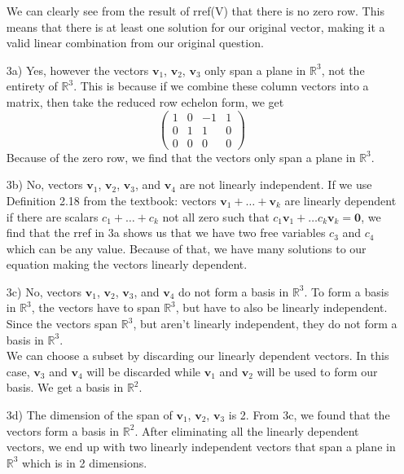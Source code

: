 \documentclass{article}
\begin{document}
\begin{enumerate}
    We can clearly see from the result of
    rref(V) that there is no zero row. This means that there is at least one solution
    for our original vector, making it a valid linear combination from our original question.

    \item[3a)] Yes, however the vectors ${\textbf{v}}_1$, ${\textbf{v}}_2$, ${\textbf{v}}_3$ only span a plane in $\mathbb{R}^3$, not the entirety of $\mathbb{R}^3$. This is because if we combine these column vectors into a matrix, then take the reduced row echelon form, we get
    $$
    \begin{pmatrix}
        1 & 0 & -1 & 1\\
        0 & 1 & 1 & 0\\
        0 & 0 & 0 & 0
    \end{pmatrix}
    $$
    Because of the zero row, we find that the vectors only span a plane in $\mathbb{R}^3$.
    
    \item[3b)] No, vectors ${\textbf{v}}_1$, ${\textbf{v}}_2$, ${\textbf{v}}_3$, and ${\textbf{v}}_4$ are not linearly independent. If we use Definition 2.18 from the textbook: vectors ${\textbf{v}}_1 + \dots + {\textbf{v}}_k$ are linearly dependent if there are scalars ${c}_1 + \dots + {c}_k$ not all zero such that ${c}_1{\textbf{v}_1} + \dots {c}_k{\textbf{v}_k} = \textbf{0}$, we find that the rref in 3a shows us that we have two free variables ${c}_3$ and ${c}_4$ which can be any value. Because of that, we have many solutions to our equation making the vectors linearly dependent.   
    \item[3c)] No, vectors ${\textbf{v}}_1$, ${\textbf{v}}_2$, ${\textbf{v}}_3$, and ${\textbf{v}}_4$ do not form a basis in $\mathbb{R}^3$. To form a basis in $\mathbb{R}^3$, the vectors have to span $\mathbb{R}^3$, but have to also be linearly independent. Since the vectors span $\mathbb{R}^3$, but aren't linearly independent, they do not form a basis in $\mathbb{R}^3$. \\ We can choose a subset by discarding our linearly dependent vectors. In this case, ${\textbf{v}}_3$ and ${\textbf{v}}_4$ will be discarded while ${\textbf{v}}_1$ and ${\textbf{v}}_2$ will be used to form our basis. We get a basis in $\mathbb{R}^2$.
    
    \item[3d)] The dimension of the span of ${\textbf{v}}_1$, ${\textbf{v}}_2$, ${\textbf{v}}_3$ is 2. From 3c, we found that the vectors form a basis in $\mathbb{R}^2$. After eliminating all the linearly dependent vectors, we end up with two linearly independent vectors that span a plane in $\mathbb{R}^3$ which is in 2 dimensions.
\end{enumerate}
\end{document}
